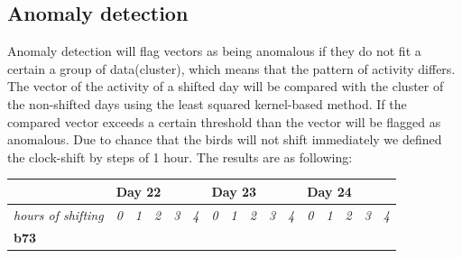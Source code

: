 \documentclass[a4paper]{article}
\begin{document}
\subsection*{Anomaly detection}
Anomaly detection will flag vectors as being anomalous if they do not fit a certain a group of data(cluster), which means that the pattern of activity differs. The vector of the activity of a shifted day will be compared with the cluster of the non-shifted days using the least squared kernel-based method. If the compared vector exceeds a certain threshold than the vector will be flagged as anomalous. Due to chance that the birds will not shift immediately we defined the clock-shift by steps of 1 hour. The results are as following:\\
\begin{table}[H]
\centering
\begin{tabular}{llllllllllllllll}
\hline
\multicolumn{1}{|l|}{} & \multicolumn{5}{l|}{\textbf{Day 22}} & \multicolumn{5}{l|}{\textbf{Day 23}} & \multicolumn{5}{l|}{\textbf{Day 24}} \\ \hline
\multicolumn{1}{|l|}{\textit{hours of shifting}} & \multicolumn{1}{l|}{\textit{0}} & \multicolumn{1}{l|}{\textit{1}} & \multicolumn{1}{l|}{\textit{2}} & \multicolumn{1}{l|}{\textit{3}} & \multicolumn{1}{l|}{\textit{4}} & \multicolumn{1}{l|}{\textit{0}} & \multicolumn{1}{l|}{\textit{1}} & \multicolumn{1}{l|}{\textit{2}} & \multicolumn{1}{l|}{\textit{3}} & \multicolumn{1}{l|}{\textit{4}} & \multicolumn{1}{l|}{\textit{0}} & \multicolumn{1}{l|}{\textit{1}} & \multicolumn{1}{l|}{\textit{2}} & \multicolumn{1}{l|}{\textit{3}} & \multicolumn{1}{l|}{\textit{4}} \\ \hline
\multicolumn{1}{|l|}{\textbf{b73}} & \multicolumn{1}{l|}{\cellcolor[HTML]{67FD9A}} & \multicolumn{1}{l|}{\cellcolor[HTML]{67FD9A}} & \multicolumn{1}{l|}{\cellcolor[HTML]{67FD9A}} & \multicolumn{1}{l|}{\cellcolor[HTML]{67FD9A}} & \multicolumn{1}{l|}{\cellcolor[HTML]{67FD9A}} & \multicolumn{1}{l|}{\cellcolor[HTML]{67FD9A}} & \multicolumn{1}{l|}{\cellcolor[HTML]{67FD9A}} & \multicolumn{1}{l|}{\cellcolor[HTML]{67FD9A}} & \multicolumn{1}{l|}{\cellcolor[HTML]{67FD9A}} & \multicolumn{1}{l|}{\cellcolor[HTML]{67FD9A}} & \multicolumn{1}{l|}{\cellcolor[HTML]{FD6864}} & \multicolumn{1}{l|}{\cellcolor[HTML]{67FD9A}} & \multicolumn{1}{l|}{\cellcolor[HTML]{FD6864}} & \multicolumn{1}{l|}{\cellcolor[HTML]{FD6864}} & \multicolumn{1}{l|}{\cellcolor[HTML]{FD6864}} \\ \hline

\end{tabular}
\end{table}
\end{document}
